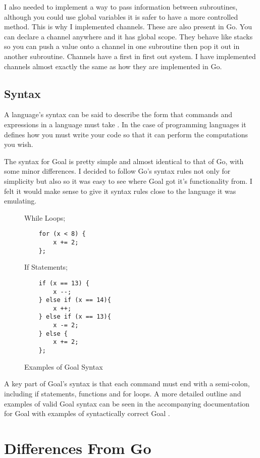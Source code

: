 I also needed to implement a way to pass information between subroutines, although you could use global variables it is safer to have a more controlled method. This is why I implemented channels. These are also present in Go. You can declare a channel anywhere and it has global scope. They behave like stacks so you can push a value onto a channel in one subroutine then pop it out in another subroutine. Channels have a first in first out system. I have implemented channels almost exactly the same as how they are implemented in Go. 

\subsection{Syntax}

A language's syntax can be said to describe the form that commands and expressions in a language must take \cite[p.~72]{CompGen1997}. In the case of programming languages it defines how you must write your code so that it can perform the computations you wish.

The syntax for Goal is pretty simple and almost identical to that of Go, with some minor differences. I decided to follow Go's syntax rules not only for simplicity but also so it was easy to see where Goal got it's functionality from. I felt it would make sense to give it syntax rules close to the language it was emulating.

\begin{figure}[h]
\centering
While Loops;
\begin{lstlisting}
	for (x < 8) {
		x += 2;
	};
\end{lstlisting}

If Statements;
\begin{lstlisting}
	if (x == 13) {
		x --;
	} else if (x == 14){
		x ++;
	} else if (x == 13){
		x -= 2;
	} else {
		x += 2;
	};
\end{lstlisting}

\caption{Examples of Goal Syntax}
\label{fig:egGoalSyntax} 
\end{figure}
 
A key part of Goal's syntax is that each command must end with a semi-colon, including if statements, functions and for loops. A more detailed outline and examples of valid Goal syntax can be seen in the accompanying documentation for Goal with examples of syntactically correct Goal \cite{GoalDoc}. 


\section{Differences From Go}

